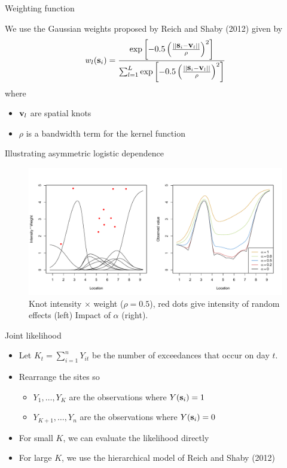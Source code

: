 \documentclass{beamer}
\begin{document}
\begin{frame}{Weighting function}
\begin{adjustwidth}{1em}{0em}
  We use the Gaussian weights proposed by Reich and Shaby (2012) given by
  \footnotesize{
  \begin{align*}
    w_l(\mbox{\bf s}_i) = \frac{ \exp\left[ -0.5 \left( \frac{ || \mbox{\bf s}_i - \mbox{\bf v}_l || }{ \rho} \right)^2 \right]}{ \sum_{l = 1}^L \exp\left[ -0.5 \left( \frac{ || \mbox{\bf s}_i - \mbox{\bf v}_l || }{ \rho} \right)^2 \right] }
  \end{align*}
  }
  where
  \begin{itemize} \setlength{\itemsep}{0.25em}
    \item $\mbox{\bf v}_l$ are spatial knots
    \item $\rho$ is a bandwidth term for the kernel function
  \end{itemize}
\end{adjustwidth}
\end{frame}

\begin{frame}{Illustrating asymmetric logistic dependence}
  \centering
  \begin{figure}
    \includegraphics[width=\linewidth, trim=0 0.5in 0 0]{./plots/max-stable.pdf}
    \caption{Knot intensity $\times$ weight ($\rho = 0.5$), red dots give intensity of random effects (left) Impact of $\alpha$ (right).}
   \end{figure}
\end{frame}

\begin{frame}{Joint likelihood}
  \begin{itemize} \setlength{\itemsep}{1em}
    \item Let $K_t = \sum_{i = 1}^n Y_{it}$ be the number of exceedances that occur on day $t$.
    \item Rearrange the sites so
    \begin{itemize}
      \item $Y_1, \ldots, Y_K$ are the observations where $Y(\mbox{\bf s}_i) = 1$
      \item $Y_{K+1}, \ldots, Y_n$ are the observations where $Y(\mbox{\bf s}_i) = 0$
    \end{itemize}
    \item For small $K$, we can evaluate the likelihood directly
    \item For large $K$, we use the hierarchical model of Reich and Shaby (2012)
  \end{itemize}
\end{frame}
\end{document}
